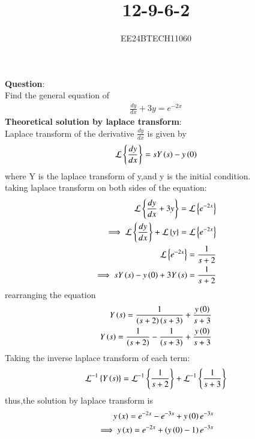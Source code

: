 \documentclass[journal]{IEEEtran}
\begin{document}

\vspace{3cm}

\title{12-9-6-2}
\author{EE24BTECH11060}
{\let\newpage\relax\maketitle}

\renewcommand{\thefigure}{\theenumi}
\renewcommand{\thetable}{\theenumi}
\setlength{\intextsep}{10pt} %


\renewcommand{\thetable}{\theenumi}

\textbf{Question}:\\
Find the general equation of 
\begin{align}
    \frac{dy}{dx}+3y=e^{-2x}
\end{align}
\textbf{Theoretical solution by laplace transform}:\\
Laplace transform of the derivative $\frac{dy}{dx}$ is given by 
\begin{align}
    \mathcal{L}\left\{\frac{dy}{dx}\right\}=sY\left(s\right)-y\left(0\right)
\end{align}
where Y is the laplace transform of y,and y is the initial condition.\\
taking laplace transform on both sides of the equation:
\begin{align}
    \mathcal{L}\left\{\frac{dy}{dx}+3y\right\}=\mathcal{L}\left\{e^{-2x}\right\}\\
    \implies \mathcal{L}\left\{\frac{dy}{dx}\right\}+\mathcal{L}\left\{y\right\}=\mathcal{L}\left\{e^{-2x}\right\}\\
    \mathcal{L}\left\{e^{-2x}\right\}=\frac{1}{s+2}\\
    \implies sY\left(s\right)-y\left(0\right)+3Y\left(s\right)=\frac{1}{s+2}
\end{align}
rearranging the equation 
\begin{align}
    Y\left(s\right)=\frac{1}{\left(s+2\right)\left(s+3\right)}+\frac{y\left(0\right)}{s+3}\\
     Y\left(s\right)=\frac{1}{\left(s+2\right)}-\frac{1}{\left(s+3\right)}+\frac{y\left(0\right)}{s+3}
\end{align}
Taking the inverse laplace transform of each term:
\begin{align}
    \mathcal{L}^{-1}\left\{Y\left(s\right)\right\}=\mathcal{L}^{-1}\left\{\frac{1}{s+2}\right\}+\mathcal{L}^{-1}\left\{\frac{1}{s+3}\right\}
\end{align}
thus,the solution by laplace transform is 
\begin{align}
    y\left(x\right)=e^{-2x}-e^{-3x}+y\left(0\right)e^{-3x}\\
    \implies  y\left(x\right)=e^{-2x}+\left(y\left(0\right)-1\right)e^{-3x}
\end{align}
\end{document}
